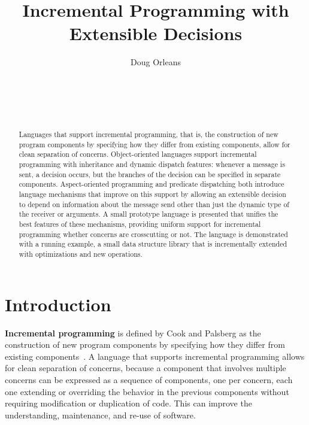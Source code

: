 \documentclass{acm_proc_article-sp}
\title{Incremental Programming with Extensible Decisions}
\author{
\alignauthor Doug Orleans\\
\affaddr{College of Computer Science}\\
\affaddr{Northeastern University}\\
\affaddr{360 Huntington Avenue 161CN}\\
\affaddr{Boston, Massachusetts 02115 USA}\\
\email{dougo@ccs.neu.edu}
}
\newcommand{\defn}[1]{\textbf{#1}}
\begin{document}

\maketitle


\sloppy

\begin{abstract}

Languages that support incremental programming, that is, the
construction of new program components by specifying how they differ
from existing components, allow for clean separation of concerns.
Object-oriented languages support incremental programming with
inheritance and dynamic dispatch features: whenever a message is sent,
a decision occurs, but the branches of the decision can be specified
in separate components.  Aspect-oriented programming and predicate
dispatching both introduce language mechanisms that improve on this
support by allowing an extensible decision to depend on information
about the message send other than just the dynamic type of the
receiver or arguments.  A small prototype language is presented that
unifies the best features of these mechanisms, providing uniform
support for incremental programming whether concerns are crosscutting
or not.  The language is demonstrated with a running example, a small
data structure library that is incrementally extended with
optimizations and new operations.

\end{abstract}


\section{Introduction}

\defn{Incremental programming} is defined by Cook and Palsberg as the
construction of new program components by specifying how they differ
from existing components~\cite{cook89denotational}.  A language that
supports incremental programming allows for clean separation of
concerns, because a component that involves multiple concerns can be
expressed as a sequence of components, one per concern, each one
extending or overriding the behavior in the previous components
without requiring modification or duplication of code.  This can
improve the understanding, maintenance, and re-use of software.
\end{document}
